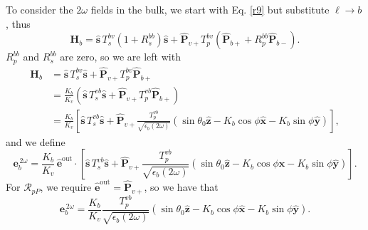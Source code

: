 To consider the $2\omega$ fields in the bulk, we start with Eq. \eqref{r9} but
substitute $\ell\rightarrow b$, thus
\begin{equation*}
\mathbf{H}_{b}
= \hat{\mathbf{s}}\,T_s^{b v}\left(1+R_{s}^{b b}\right)\hat{\mathbf{s}}
+ \hat{\mathbf{P}}_{v+}T_{p}^{b v}
\left(
\hat{\mathbf{P}}_{b+} + R_{p}^{b b}\hat{\mathbf{P}}_{b-}
\right).
\end{equation*}
$R_{p}^{b b}$ and $R_{s}^{b b}$ are zero, so we are left with
\begin{equation*}
\begin{split}
\mathbf{H}_{b}
&= \hat{\mathbf{s}}\,T_s^{b v}\hat{\mathbf{s}}
 + \hat{\mathbf{P}}_{v+}T_{p}^{b v}\hat{\mathbf{P}}_{b+}\\
&= \frac{K_{b}}{K_{v}}\left(\hat{\mathbf{s}}\,T_s^{vb}\hat{\mathbf{s}}
 + \hat{\mathbf{P}}_{v+}T_{p}^{vb}\hat{\mathbf{P}}_{b+}\right)\\
&= \frac{K_{b}}{K_{v}}
   \left[
   \hat{\mathbf{s}}\,T_s^{vb}\hat{\mathbf{s}}
 + \hat{\mathbf{P}}_{v+}
   \frac{T_{p}^{vb}}{\sqrt{\epsilon_{b}(2\omega)}}
   (\sin\theta_{0}\hat{\mathbf{z}}
 - K_{b}\cos\phi\hat{\mathbf{x}} 
 - K_{b}\sin\phi\hat{\mathbf{y}})
   \right],
\end{split}
\end{equation*}
and we define
\begin{equation*}
\mathbf{e}^{\,2\omega}_{b}
= \frac{K_{b}}{K_{v}}\,\hat{\mathbf{e}}^{\mathrm{out}}\cdot
\left[
   \hat{\mathbf{s}}\,T_s^{vb}\hat{\mathbf{s}}
 + \hat{\mathbf{P}}_{v+}
   \frac{T_{p}^{vb}}{\sqrt{\epsilon_{b}(2\omega)}}
   (\sin\theta_{0}\hat{\mathbf{z}}
 - K_{b}\cos\phi\hat{\mathbf{x}} 
 - K_{b}\sin\phi\hat{\mathbf{y}})
   \right].
\end{equation*}
For $\mathcal{R}_{pP}$, we require
$\hat{\mathbf{e}}^{\mathrm{out}}=\hat{\mathbf{P}}_{v+}$, so we have that
\begin{equation*}
\mathbf{e}^{\,2\omega}_{b}
= \frac{K_{b}}{K_{v}}
  \frac{T_{p}^{vb}}{\sqrt{\epsilon_{b}(2\omega)}}
  (\sin\theta_{0}\hat{\mathbf{z}}
- K_{b}\cos\phi\hat{\mathbf{x}} 
- K_{b}\sin\phi\hat{\mathbf{y}}).
\end{equation*}

